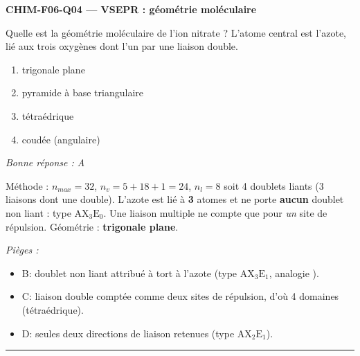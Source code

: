 \documentclass[11pt,a4paper]{article}
\begin{document}
\noindent\textbf{CHIM-F06-Q04 --- VSEPR : géométrie moléculaire}\par
Quelle est la géométrie moléculaire de l'ion nitrate  ? L'atome central est l'azote, lié
aux trois oxygènes dont l'un par une liaison double.
\begin{enumerate}[label=\Alph*)]
\item trigonale plane
\item pyramide à base triangulaire
\item tétraédrique
\item coudée (angulaire)
\end{enumerate}
\textit{Bonne réponse : A}\par
Méthode : $n_{max}=32$, $n_v=5+18+1=24$, $n_l=8$ soit 4 doublets liants (3 liaisons  dont une
double). L'azote est lié à \textbf{3} atomes et ne porte \textbf{aucun} doublet non liant : type
$\mathrm{AX_3E_0}$. Une liaison multiple ne compte que pour \emph{un} site de répulsion. Géométrie :
\textbf{trigonale plane}.\par
\textit{Pièges :}
\begin{itemize}
\item B: doublet non liant attribué à tort à l'azote (type $\mathrm{AX_3E_1}$, analogie ).
\item C: liaison double comptée comme deux sites de répulsion, d'où 4 domaines (tétraédrique).
\item D: seules deux directions de liaison retenues (type $\mathrm{AX_2E_1}$).
\end{itemize}
\vspace{8pt}\hrule\vspace{8pt}
\end{document}
